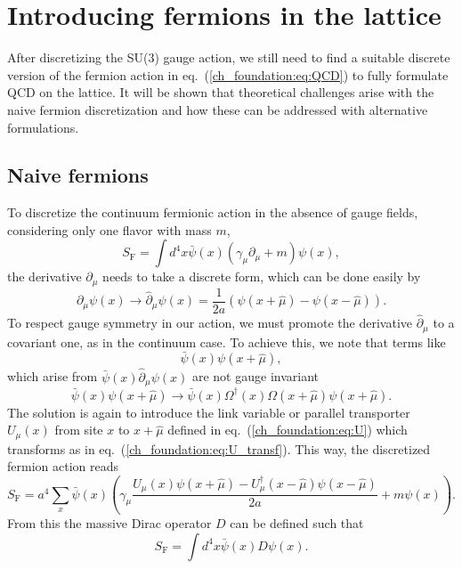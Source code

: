 \section{Introducing fermions in the lattice}
\label{ch_foundation:sec:Fermions}


After discretizing the SU(3) gauge action, we still need to find a suitable discrete version of the fermion action in eq.~(\ref{ch_foundation:eq:QCD}) to fully formulate QCD on the lattice. It will be shown that theoretical challenges arise with the naive fermion discretization and how these can be addressed with alternative formulations.

\subsection{Naive fermions}
\label{ch_foundation:subsec:Naive}

To discretize the continuum fermionic action in the absence of gauge fields, considering only one flavor with mass $m$,
\begin{equation}
S_{\textrm{F}}=\int d^4x\bar{\psi}(x)\left(\gamma_{\mu}\partial_{\mu}+m\right)\psi(x),
\end{equation}
the derivative $\partial_{\mu}$ needs to take a discrete form, which can be done easily by
\begin{equation}
\partial_{\mu}\psi(x)\rightarrow\hat{\partial}_{\mu}\psi(x)=\frac{1}{2a}\left(\psi(x+\hat{\mu})-\psi(x-\hat{\mu})\right).
\end{equation}
To respect gauge symmetry in our action, we must promote the derivative $\hat{\partial}_{\mu}$ to a covariant one, as in the continuum case. To achieve this, we note that terms like
\begin{equation}
\bar{\psi}(x)\psi(x+\hat{\mu}),
\end{equation}
which arise from $\bar{\psi}(x)\hat{\partial}_{\mu}\psi(x)$ are not gauge invariant
\begin{equation}
\bar{\psi}(x)\psi(x+\hat{\mu})\to\bar{\psi}(x)\Omega^{\dagger}(x)\Omega(x+\hat{\mu})\psi(x+\hat{\mu}).
\end{equation}
The solution is again to introduce the link variable or parallel transporter $U_{\mu}(x)$ from site $x$ to $x+\hat{\mu}$ defined in eq.~(\ref{ch_foundation:eq:U}) which transforms as in eq.~(\ref{ch_foundation:eq:U_transf}). This way, the discretized fermion action reads
\begin{equation}
\label{ch_foundation:eq:naive}
S_{\textrm{F}}=a^4\sum_x\bar{\psi}(x)\left(\gamma_{\mu}\frac{U_{\mu}(x)\psi(x+\hat{\mu})-U_{\mu}^{\dagger}(x-\hat{\mu})\psi(x-\hat{\mu})}{2a}+m\psi(x)\right).
\end{equation}
From this the massive Dirac operator $D$ can be defined such that
\begin{equation}
S_{\textrm{F}}=\int d^4x\bar{\psi}(x)D\psi(x).
\end{equation}

